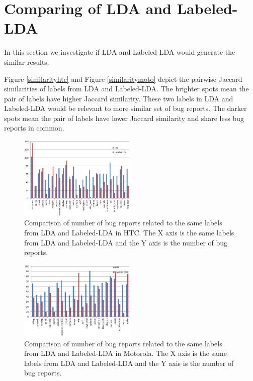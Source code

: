 \documentclass[10pt, conference, compsocconf]{IEEEtran}
\begin{document}
\section{Comparing of LDA and Labeled-LDA}
\label{sec:comparinglda}

In this section we investigate if LDA and Labeled-LDA would generate the similar results.

Figure \ref{similarityhtc} and Figure \ref{similaritymoto} depict the pairwise Jaccard similarities of labels from LDA and Labeled-LDA. The brighter spots mean the pair of labels have higher Jaccard similarity. These two labels in LDA and Labeled-LDA would be relevant to more similar set of bug reports. The darker spots mean the pair of labels have lower Jaccard similarity and share less bug reports in common. 

\begin{figure}[htb]
\centering
\includegraphics[width=0.5\textwidth]{htcldallda.png}
\caption{Comparison of number of bug reports related to the same labels from LDA and Labeled-LDA in HTC. The X axis is the same labels from LDA and Labeled-LDA and the Y axis is the number of bug reports.}
\label{bughtc}
\end{figure}

\begin{figure}[!htb]
\centering
\includegraphics[width=0.5\textwidth]{motoldallda.png}
\caption{Comparison of number of bug reports related to the same labels from LDA and Labeled-LDA in Motorola. The X axis is the same labels from LDA and Labeled-LDA and the Y axis is the number of bug reports.}
\label{bugmoto}
\end{figure}
\end{document}
